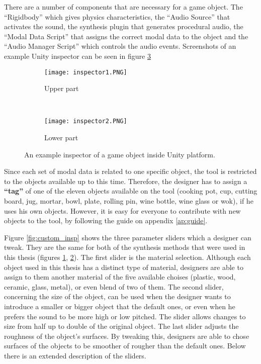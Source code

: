 There are a number of components that are necessary for a game object. The ``Rigidbody'' which gives physics characteristics, the ``Audio Source'' that activates the sound, the synthesis plugin that generates procedural audio, the ``Modal Data Script'' that assigns the correct modal data to the object and the ``Audio Manager Script'' which controls the audio events. Screenshots of an example Unity\textsuperscript{\textregistered} inspector can be seen in figure \ref{fig:audio_insp} 

\begin{figure}[H]
    \centering
    \begin{subfigure}[b]{0.45\textwidth}
        \texttt{[image: inspector1.PNG]}
        \caption{Upper part}
        \label{fig:FB}
    \end{subfigure}
    ~ %
    \begin{subfigure}[b]{0.45\textwidth}
        \texttt{[image: inspector2.PNG]}
        \caption{Lower part}
        \label{fig:sin}
    \end{subfigure}
    \caption{An example inspector of a game object inside Unity\textsuperscript{\textregistered} platform.}\label{fig:audio_insp}
\end{figure}

Since each set of modal data is related to one specific object, the tool is restricted to the objects available up to this time. Therefore, the designer has to assign a \textbf{``tag''} of one of the eleven objects available on the tool (cooking pot, cup, cutting board, jug, mortar, bowl, plate, rolling pin, wine bottle, wine glass or wok), if he uses his own objects. However, it is easy for everyone to contribute with new objects to the tool, by following the guide on appendix \ref{ap:guide}.

Figure \ref{fig:custom_insp} shows the three parameter sliders which a designer can tweak. They are the same for both of the synthesis methods that were used in this thesis (figures \ref{fig:FB}, \ref{fig:sin}). The first slider is the material selection. Although each object used in this thesis has a distinct type of material, designers are able to assign to them another material of the five available choises (plastic, wood, ceramic, glass, metal), or even blend of two of them. The second slider, concerning the size of the object, can be used when the designer wants to introduce a smaller or bigger object that the default ones, or even when he prefers the sound to be more high or low pitched. The slider allows changes to size from half up to double of the original object. The last slider adjusts the roughness of the object's surfaces. By tweaking this, designers are able to chose surfaces of the objects to be smoother of rougher than the default ones. Below there is an extended description of the sliders.

